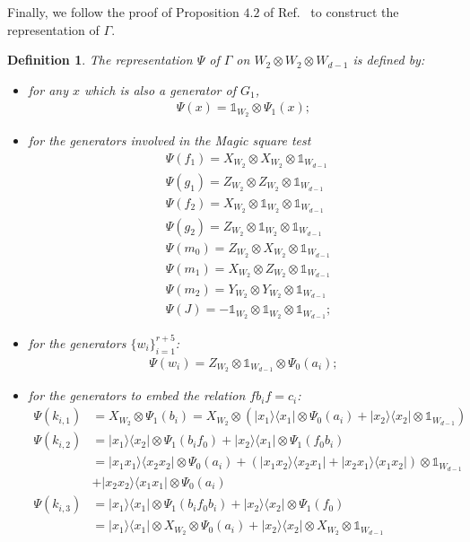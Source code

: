 \documentclass[11pt,letterpaper]{article}
\newcommand{\ketbra}[2]{|#1\rangle\langle#2|}
\newcommand{\x}{\otimes}
\newcommand{\1}{\mathbb{1}}
\newtheorem{definition}[theorem]{Definition}
\theoremstyle{definition}
\begin{document}
Finally, we follow the proof of Proposition $4.2$ of Ref.~\cite{slofstra2017} to construct the 
representation of $\Gamma$.
\begin{definition}
\label{def:rep_gamma}
The representation $\Psi$ of $\Gamma$ on $W_2 \x W_2 \x W_{d-1}$ is defined by:
\begin{itemize}
\item for any $x$ which is also a generator of $G_1$,
\begin{align*}
	\Psi(x) = \1_{W_2} \x \Psi_1(x);
\end{align*}
\item for the generators involved in the Magic square test
\begin{align*}
	&\Psi(f_1) = X_{W_2} \x X_{W_2} \x \1_{W_{d-1}} \\
	&\Psi(g_1) = Z_{W_2} \x Z_{W_2} \x \1_{W_{d-1}} \\
	&\Psi(f_2) = X_{W_2} \x \1_{W_2} \x \1_{W_{d-1}} \\
	&\Psi(g_2) = Z_{W_2} \x \1_{W_2} \x \1_{W_{d-1}} \\
	& \Psi(m_0) = Z_{W_2} \x X_{W_2} \x \1_{W_{d-1}}\\
	& \Psi(m_1) = X_{W_2} \x Z_{W_2} \x \1_{W_{d-1}}\\
	& \Psi(m_2) = Y_{W_2} \x Y_{W_2} \x \1_{W_{d-1}}\\
	& \Psi(J) = - \1_{W_2} \x \1_{W_2} \x \1_{W_{d-1}};
\end{align*}
\item for the generators $\{ w_i \}_{i=1}^{r+5}$:
\begin{align*}
	\Psi(w_i) = Z_{W_2} \x \1_{W_{d-1}} \x \Psi_0(a_i);
\end{align*}
\item for the generators to embed the relation $f b_i f = c_i$:
\begin{align*}
	\Psi(k_{i,1}) &= X_{W_2} \x \Psi_1(b_i) = X_{W_2} \x ( \ketbra{x_1}{x_1} \x \Psi_0(a_i) + \ketbra{x_2}{x_2} \x \1_{W_{d-1}} )\\
	\Psi(k_{i,2}) &= \ketbra{x_1}{x_2} \x \Psi_1(b_if_0) + \ketbra{x_2}{x_1} \x \Psi_1(f_0b_i)\\
	&= \ketbra{x_1x_1}{x_2x_2} \x \Psi_0(a_i) + (\ketbra{x_1x_2}{x_2x_1}+\ketbra{x_2x_1}{x_1x_2})\x\1_{W_{d-1}}\\
	&+ \ketbra{x_2x_2}{x_1x_1} \x \Psi_0(a_i)\\ 
	\Psi(k_{i,3}) &= \ketbra{x_1}{x_1} \x \Psi_1(b_if_0b_i) + \ketbra{x_2}{x_2} \x \Psi_1(f_0) \\
	&= \ketbra{x_1}{x_1} \x X_{W_2} \x \Psi_0(a_i) +  \ketbra{x_2}{x_2} \x X_{W_2} \x \1_{W_{d-1}}\\

\end{align*}
\end{itemize}
\end{definition}
\end{document}
